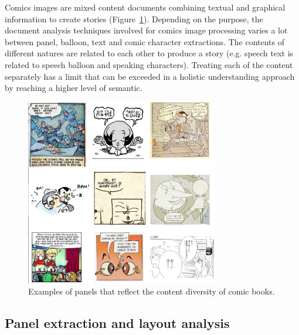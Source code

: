 
Comics images are mixed content documents combining textual and graphical information to create stories (Figure~\ref{fig:kn:comics_diversity}).
Depending on the purpose, the document analysis techniques involved for comics image processing varies a lot between panel, balloon, text and comic character extractions.
The contents of different natures are related to each other to produce a story (e.g. speech text is related to speech balloon and speaking characters).
Treating each of the content separately has a limit that can be exceeded in a holistic understanding approach by reaching a higher level of semantic.


\begin{figure}[ht]  %
   \centering
  \includegraphics[trim= 4px 0px 0px 0px, clip, width=0.75\textwidth]{comics_diversity.png}
  \caption{Examples of panels that reflect the content diversity of comic books.}
  \label{fig:kn:comics_diversity}
 \end{figure}

\subsection{Panel extraction and layout analysis}
\label{sec:sota:layout_panel}

% 

